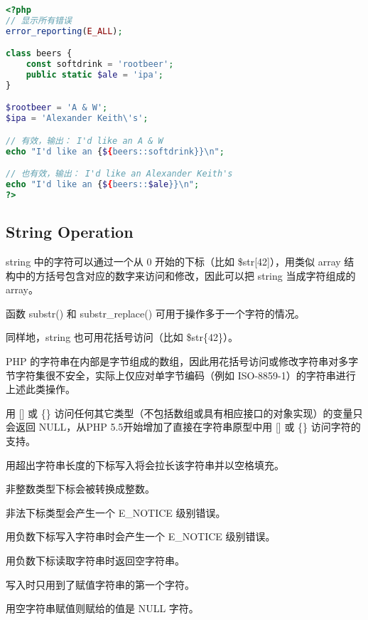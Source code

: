 \begin{compactitem}
\begin{lstlisting}[language=PHP]
<?php
// 显示所有错误
error_reporting(E_ALL);

class beers {
    const softdrink = 'rootbeer';
    public static $ale = 'ipa';
}

$rootbeer = 'A & W';
$ipa = 'Alexander Keith\'s';

// 有效，输出： I'd like an A & W
echo "I'd like an {${beers::softdrink}}\n";

// 也有效，输出： I'd like an Alexander Keith's
echo "I'd like an {${beers::$ale}}\n";
?>
\end{lstlisting}

\end{compactitem}


\subsection{String Operation}




\begin{compactitem}
\item string 中的字符可以通过一个从 0 开始的下标（比如 \$str[42]），用类似 array 结构中的方括号包含对应的数字来访问和修改，因此可以把 string 当成字符组成的 array。
\item 函数 substr() 和 substr\_replace() 可用于操作多于一个字符的情况。
\item 同样地，string 也可用花括号访问（比如 \$str\{42\}）。
\end{compactitem}


PHP 的字符串在内部是字节组成的数组，因此用花括号访问或修改字符串对多字节字符集很不安全，实际上仅应对单字节编码（例如 ISO-8859-1）的字符串进行上述此类操作。

用 [\/] 或 \{\} 访问任何其它类型（不包括数组或具有相应接口的对象实现）的变量只会返回 NULL，从PHP 5.5开始增加了直接在字符串原型中用 [\/] 或 \{\} 访问字符的支持。

\begin{compactitem}
\item 用超出字符串长度的下标写入将会拉长该字符串并以空格填充。
\item 非整数类型下标会被转换成整数。
\item 非法下标类型会产生一个 E\_NOTICE 级别错误。
\item 用负数下标写入字符串时会产生一个 E\_NOTICE 级别错误。
\item 用负数下标读取字符串时返回空字符串。
\item 写入时只用到了赋值字符串的第一个字符。
\item 用空字符串赋值则赋给的值是 NULL 字符。
\end{compactitem}


